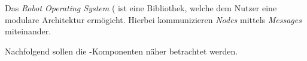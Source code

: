 
Das \textit{Robot Operating System} (\ROS\) ist eine  Bibliothek, welche dem Nutzer eine modulare Architektur ermögicht.
Hierbei kommunizieren \textit{Nodes} mittels \textit{Messages} miteinander.

Nachfolgend sollen die \Ros-Komponenten näher betrachtet werden.


